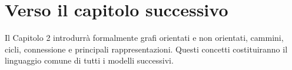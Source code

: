 \documentclass[11pt,a4paper]{article}
\begin{document}
\section*{Verso il capitolo successivo}
Il Capitolo 2 introdurrà formalmente grafi orientati e non orientati, cammini, cicli, connessione e principali rappresentazioni. Questi concetti costituiranno il linguaggio comune di tutti i modelli successivi.
\end{document}
